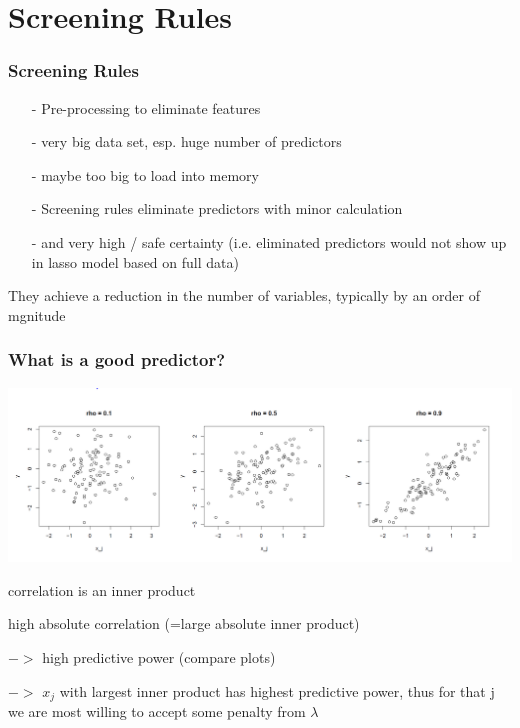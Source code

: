 \documentclass{beamer}
\begin{document}


\section{Screening Rules}

\begin{frame}
\frametitle{Screening Rules}

\begin{itemize}
	\item[-] Pre-processing to eliminate features
	\item[-] very big data set, esp. huge number of predictors
	\item[-] maybe too big to load into memory
	\item[-] Screening rules eliminate predictors with minor calculation
	\item[-] and very high / safe certainty (i.e. eliminated predictors would not show up in lasso model based on full data)
\end{itemize}


They achieve a reduction in the number of variables, typically by an order of mgnitude




\end{frame}

\begin{frame}
\frametitle{What is a good predictor?}

\includegraphics[width=\linewidth]{img/differentCorrelationPlots}

correlation is an inner product

high absolute correlation (=large absolute inner product) 

$->$ high predictive power (compare plots) 

$->$ $x_j$ with largest inner product has highest predictive power, thus for that j we are most willing to accept some penalty from $\lambda$

\end{frame}
\end{document}
